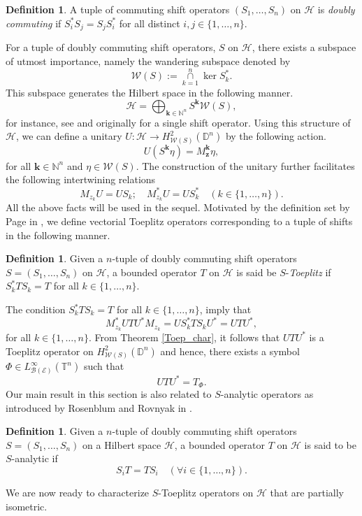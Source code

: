 \documentclass[12pt]{amsart}
\theoremstyle{definition}
\newtheorem{defn}[propn]{Definition}
\newcommand{\Nat}{\mathbb{N}}
\newcommand{\D}{\mathbb{D}}
\newcommand{\1}{{\mbox{\bf 1}}}
\newcommand{\clb}{\mathcal{B}}
\newcommand{\cle}{\mathcal{E}}
\newcommand{\clh}{\mathcal{H}}
\newcommand{\clw}{\mathcal{W}}
\newcommand{\raro}{\rightarrow}
\begin{document}
\begin{defn}
A tuple of commuting shift operators $(S_1,\ldots,S_n)$ on $\clh$ is \textit{doubly commuting} if $S_i^* S_j = S_j S_i^*$ for all distinct $i,j \in \{1,\ldots,n\}$. 
\end{defn}
For a tuple of doubly commuting shift operators, $S$ on $\clh$, there exists a subspace of utmost importance, namely the wandering subspace denoted by 
\[
\clw(S):= \underset{k=1}{\overset{n}{\cap}} \ker S_k^*.
\]
This subspace generates the Hilbert space in the following manner.
\[
\clh = \bigoplus_{\bm{k} \in \Nat^n} S^{\bm{k}} \clw(S),
\]
for instance, see \cite[Corollary 3.2]{JS} and originally \cite{Halmos} for a single shift operator. Using this structure of $\clh$, we can define a unitary $U:\clh \raro H_{\clw(S)}^2(\D^n)$ by the following action.
\[
U (S^{\bm{k}} \eta) = M_{\bm{z}}^{\bm{k}} \eta,
\]
for all $\bm{k} \in \Nat^n$ and $\eta \in \clw(S)$. The construction of the unitary further facilitates the following intertwining relations
\begin{equation}\label{inter}
M_{z_k} U = U S_k; \quad M_{z_k}^* U = U S_k^* \quad (k \in \{1,\ldots,n\}).
\end{equation}
All the above facts will be used in the sequel.  Motivated by the definition set by Page in \cite{Page}, we define vectorial Toeplitz operators corresponding to a tuple of shifts in the following manner.
\begin{defn}
Given a $n$-tuple of doubly commuting shift operators $S=(S_1,\ldots,S_n)$ on $\clh$, a bounded operator $T$ on $\clh$ is said be $S$-\textit{Toeplitz} if $S_k^*TS_k=T$ for all $k \in \{1,\ldots,n\}$.
\end{defn}
The condition $S_k^* T S_k = T$ for all $k \in \{1,\ldots,n\}$, imply that 
\[
M_{z_k}^* U T U^* M_{z_k} = U  S_k^* T S_k U^* = U T U^*,
\]
for all $k \in \{1,\ldots,n\}$. From Theorem \ref{Toep_char}, it follows that $UTU^*$ is a Toeplitz operator on $H_{\clw(S)}^2(\D^n)$ and hence, there exists a symbol $\Phi \in L_{\clb(\cle)}^{\infty}(\mathbb{T}^n)$ such that
\begin{equation}\label{d3}
UTU^* = T_{\Phi}.
\end{equation}
Our main result in this section is also related to $S$-analytic operators as introduced by Rosenblum and Rovnyak in \cite[Section 1.6, Page 6]{RR}.

\begin{defn}
Given a $n$-tuple of doubly commuting shift operators $S=(S_1,\ldots,S_n)$ on a Hilbert space $\clh$, a bounded operator $T$ on $\clh$ is said to be $S$-analytic if 
\[
S_i T = T S_i \quad (\forall i \in \{1,\ldots,n\}).
\]
\end{defn}
We are now ready to characterize $S$-Toeplitz operators on $\clh$ that are partially isometric.
\end{document}
